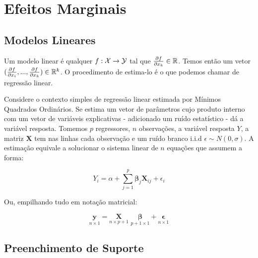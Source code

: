 
\chapter{Efeitos Marginais}

\section{Modelos Lineares}

Um modelo linear é qualquer $f: \mathcal{X} \to \mathcal{Y}$ tal que $\frac{\partial f}{\partial x_k} \in \mathbb{R}$. Temos então um vetor $(\frac{\partial f}{\partial x_i}, ..., \frac{\partial f}{\partial x_k}) \in \mathbb{R}^k$. O procedimento de estima-lo é o que podemos chamar de regressão linear. 

Considere o contexto simples de regressão linear estimada por Mínimos Quadrados Ordinários. Se estima um vetor de parâmetros cujo produto interno com um vetor de variáveis explicativas - adicionado um ruído estatístico - dá a variável resposta. Tomemos $p$ regressores, $n$ observações, a variável resposta $Y$, a matriz $\mathbf{X}$ tem nas linhas cada observação e um ruído branco i.i.d $\epsilon \sim N(0, \sigma)$. A estimação equivale a solucionar o sistema linear de $n$ equações que assumem a forma:

\begin{equation}
    Y_i = \alpha + \sum_{j = 1}^{p} \boldsymbol{\beta}_j \mathbf{X}_{ij} + \epsilon_i 
\end{equation}

Ou, empilhando tudo em notação matricial:

\begin{equation}
    \underset{n \times 1}{\mathbf{y}} = \underset{n \times p+1}{\mathbf{X}} \,\, \underset{p+1 \times 1}{\boldsymbol{\beta}}   + \underset{n \times 1}{\boldsymbol{\epsilon}}
\end{equation}






\section{Preenchimento de Suporte}